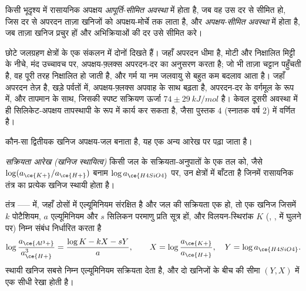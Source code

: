 \begin{definition}\label{def:b3:water-rock-interaction:regimes}
किसी भूदृश्य में रासायनिक अपक्षय \emph{आपूर्ति-सीमित अवस्था} में होता है, जब वह
उस दर से सीमित हो, जिस दर से अपरदन ताज़ा खनिजों को
अपक्षय-मोर्चे तक लाता है, और
\emph{अपक्षय-सीमित अवस्था} में होता है, जब ताज़ा खनिज प्रचुर हों
और अभिक्रियाओं की दर उसे सीमित करे।
\end{definition}

छोटे जलग्रहण क्षेत्रों के एक संकलन में दोनों दिखते हैं। जहाँ अपरदन धीमा है, मोटी और निक्षालित मिट्टी के नीचे, मंद उच्चावच पर,
अपक्षय-फ़्लक्स अपरदन-दर का अनुसरण करता है; जो भी ताज़ा चट्टान पहुँचती है, वह पूरी तरह निक्षालित हो जाती है,
और गर्म या नम जलवायु से बहुत कम बदलाव आता है। जहाँ अपरदन तेज़ है, खड़े पर्वतों में,
अपक्षय-फ़्लक्स अपवाह के साथ बढ़ता है, अपरदन-दर के वर्गमूल के रूप में,
और तापमान के साथ, जिसकी स्पष्ट सक्रियण ऊर्जा $74 \pm
\qty{29}{kJ/mol}$ है। केवल दूसरी अवस्था में ही सिलिकेट-अपक्षय
तापस्थापी के रूप में कार्य कर सकता है,
जैसा पुस्तक 4 (स्नातक वर्ष 2) में वर्णित है।

कौन-सा द्वितीयक खनिज अपक्षय-जल बनाता है, यह
एक अन्य आरेख पर पढ़ा जाता है।

\begin{definition}[सक्रियता आरेख]\label{def:b3:water-rock-interaction:activity-diagram}
\emph{सक्रियता आरेख (खनिज स्थायित्व)}
किसी जल के सक्रियता-अनुपातों के एक तल को, जैसे
$\log(a_{\ce{K+}}/a_{\ce{H+}})$ बनाम $\log a_{\ce{H4SiO4}}$ पर, उन क्षेत्रों में बाँटता है
जिनमें रासायनिक तंत्र का प्रत्येक खनिज स्थायी होता है।
\end{definition}

\begin{proposition}[सक्रियता आरेख की सीमाएँ]\label{prop:b3:water-rock-interaction:boundaries}
तंत्र ------ में, जहाँ ठोसों में एल्यूमिनियम संरक्षित है
और जल की सक्रियता एक हो, तो एक खनिज जिसमें $k$ पोटैशियम, $a$ एल्यूमिनियम और
$s$ सिलिकन परमाणु प्रति सूत्र हों, और विलयन-स्थिरांक $K$ (,
,  में घुलने पर) निम्न संबंध निर्धारित करता है
\[
\log\frac{a_{\ce{Al^3+}}}{a_{\ce{H+}}^3} = \frac{\log K - kX - sY}{a},
\qquad X = \log\frac{a_{\ce{K+}}}{a_{\ce{H+}}},\quad Y = \log a_{\ce{H4SiO4}}.
\]
स्थायी खनिज सबसे निम्न एल्यूमिनियम सक्रियता देता है, और दो खनिजों के बीच की सीमा
$(Y, X)$ में एक सीधी रेखा होती है।
\end{proposition}

